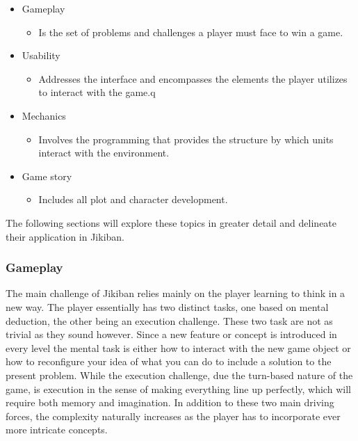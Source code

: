 \begin{itemize}

\item Gameplay
\begin{itemize}
\item Is the set of problems and challenges a player must face to win a game.
\end{itemize}

\item Usability
\begin{itemize}
\item Addresses the interface and encompasses the elements the player
  utilizes to interact with the game.q
\end{itemize}

\item Mechanics
\begin{itemize}
\item Involves the programming that provides the structure by which
  units interact with the environment.
\end{itemize}

\item Game story
\begin{itemize}
\item Includes all plot and character development.
\end{itemize}
\end{itemize}

The following sections will explore these topics in greater detail and
delineate their application in Jikiban.

\subsubsection{Gameplay}
The main challenge of Jikiban relies mainly on the player learning to
think in a new way. The player essentially has two distinct tasks, one
based on mental deduction, the other being an execution challenge.
These two task are not as trivial as they sound however. Since a new
feature or concept is introduced in every level the mental task is
either how to interact with the new game object or how to reconfigure
your idea of what you can do to include a solution to the present
problem. While the execution challenge, due the turn-based nature of
the game, is execution in the sense of making everything line up
perfectly, which will require both memory and imagination. In addition
to these two main driving forces, the complexity naturally increases
as the player has to incorporate ever more intricate concepts.

